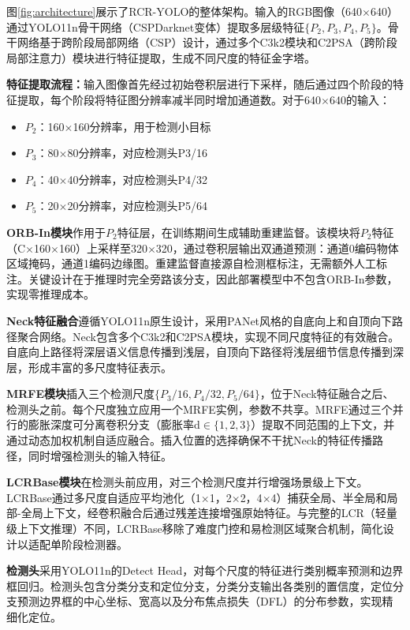 \documentclass[journal]{IEEEtran}
\begin{document}
图\ref{fig:architecture}展示了RCR-YOLO的整体架构。输入的RGB图像（640$\times$640）通过YOLO11n骨干网络（CSPDarknet变体）提取多层级特征$\{P_2, P_3, P_4, P_5\}$。骨干网络基于跨阶段局部网络（CSP）设计，通过多个C3k2模块和C2PSA（跨阶段局部注意力）模块进行特征提取，生成不同尺度的特征金字塔。

\textbf{特征提取流程：}输入图像首先经过初始卷积层进行下采样，随后通过四个阶段的特征提取，每个阶段将特征图分辨率减半同时增加通道数。对于640$\times$640的输入：
\begin{itemize}
    \item $P_2$：160$\times$160分辨率，用于检测小目标
    \item $P_3$：80$\times$80分辨率，对应检测头P3/16
    \item $P_4$：40$\times$40分辨率，对应检测头P4/32
    \item $P_5$：20$\times$20分辨率，对应检测头P5/64
\end{itemize}

\textbf{ORB-In模块}作用于$P_2$特征层，在训练期间生成辅助重建监督。该模块将$P_2$特征（C$\times$160$\times$160）上采样至320$\times$320，通过卷积层输出双通道预测：通道0编码物体区域掩码，通道1编码边缘图。重建监督直接源自检测框标注，无需额外人工标注。关键设计在于推理时完全旁路该分支，因此部署模型中不包含ORB-In参数，实现零推理成本。

\textbf{Neck特征融合}遵循YOLO11n原生设计，采用PANet风格的自底向上和自顶向下路径聚合网络。Neck包含多个C3k2和C2PSA模块，实现不同尺度特征的有效融合。自底向上路径将深层语义信息传播到浅层，自顶向下路径将浅层细节信息传播到深层，形成丰富的多尺度特征表示。

\textbf{MRFE模块}插入三个检测尺度$\{P_3/16, P_4/32, P_5/64\}$，位于Neck特征融合之后、检测头之前。每个尺度独立应用一个MRFE实例，参数不共享。MRFE通过三个并行的膨胀深度可分离卷积分支（膨胀率d$\in\{1,2,3\}$）提取不同范围的上下文，并通过动态加权机制自适应融合。插入位置的选择确保不干扰Neck的特征传播路径，同时增强检测头的输入特征。

\textbf{LCRBase模块}在检测头前应用，对三个检测尺度并行增强场景级上下文。LCRBase通过多尺度自适应平均池化（1$\times$1，2$\times$2，4$\times$4）捕获全局、半全局和局部-全局上下文，经卷积融合后通过残差连接增强原始特征。与完整的LCR（轻量级上下文推理）不同，LCRBase移除了难度门控和易检测区域聚合机制，简化设计以适配单阶段检测器。

\textbf{检测头}采用YOLO11n的Detect Head，对每个尺度的特征进行类别概率预测和边界框回归。检测头包含分类分支和定位分支，分类分支输出各类别的置信度，定位分支预测边界框的中心坐标、宽高以及分布焦点损失（DFL）的分布参数，实现精细化定位。
\end{document}
